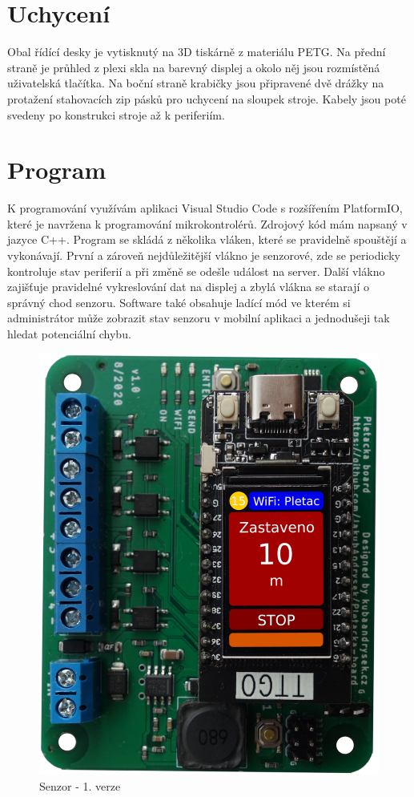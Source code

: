 \section{Uchycení}
Obal řídící desky je vytisknutý na 3D tiskárně z materiálu PETG.
Na přední straně je průhled z plexi skla na barevný displej a okolo něj jsou rozmístěná uživatelská tlačítka.
Na boční straně krabičky jsou připravené dvě drážky na protažení stahovacích zip pásků pro uchycení na sloupek stroje.
Kabely jsou poté svedeny po konstrukci stroje až k periferiím.


\section{Program}
K programování využívám aplikaci Visual Studio Code s rozšířením PlatformIO, které je navržena k programování mikrokontrolérů. 
Zdrojový kód mám napsaný v jazyce C++.
Program se skládá z několika vláken, které se pravidelně spouštějí a vykonávají.
První a zároveň nejdůležitější vlákno je senzorové, zde se periodicky kontroluje stav periferií a při změně se odešle událost na server.
Další vlákno zajišťuje pravidelné vykreslování dat na displej a zbylá vlákna se starají o správný chod senzoru.
Software také obsahuje ladící mód ve kterém si administrátor může zobrazit stav senzoru v mobilní aplikaci a jednodušeji tak hledat potenciální chybu. 


\begin{figure}[htbp]
    \centering
    \includegraphics[scale=0.2]{img/V1-deska-esp-screen.png}
    \caption{Senzor - 1. verze}
    \label{fig:SenzorV1}
\end{figure}


